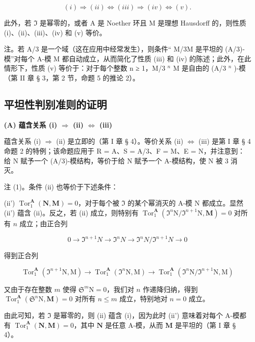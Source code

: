 \[
(i) \Rightarrow (i i) \Leftrightarrow (i i i) \Rightarrow (i v) \Leftrightarrow (v).
\]

此外，若 \(\mathfrak{I}\) 是幂零的，或者 A 是 Noether 环且 M 是理想 Hausdorff 的，则性质 (i)、(ii)、(iii)、(iv) 和 (v) 等价。

注。若 A/3 是一个域（这在应用中经常发生），则条件“ M/3M 是平坦的 (A/3)-模”对每个 A-模 M 都自动成立，从而简化了性质 (iii) 和 (iv) 的陈述；此外，在此情形下，性质 (v) 等价于：对于每个整数 n ≥ 1，M/3 \(^{n}\) M 是自由的 (A/3 \(^{n}\) )-模（第 II 章 § 3，第 2 节，命题 5 的推论 2）。

\subsection{平坦性判别准则的证明}

\textbf{(A) 蕴含关系 (i) \(\Rightarrow\) (ii) \(\Leftrightarrow\) (iii)}\par

蕴含关系 (i) \(\Rightarrow\) (ii) 是立即的（第 I 章 § 4）。等价关系 (ii) \(\Leftrightarrow\) (iii) 是第 I 章 § 4 命题 2 的特例；该命题应用于 R = A、S = A/3、F = M、E = N，并注意到：给 N 赋予一个 (A/3)-模结构，等价于给 N 赋予一个 A-模结构，使 N 被 3 消灭。

注 (1)。条件 (ii) 也等价于下述条件：

(ii') \(\operatorname{Tor}_1^{\mathbf{A}}(\mathbf{N},\mathbf{M}) = 0\)，对于每个被 \(\Im\) 的某个幂消灭的 A-模 N 都成立。显然 (ii') 蕴含 (ii)。反之，若 (ii) 成立，则特别有 \(\operatorname{Tor}_1^{\mathbf{A}}(\Im^n\mathrm{N} / \Im^{n + 1}\mathrm{N},\mathbf{M}) = 0\) 对所有 \(n\) 成立；由正合列

\[
0 \rightarrow \Im^ {n + 1} N \rightarrow \Im^ {n} N \rightarrow \Im^ {n} N / \Im^ {n + 1} N \rightarrow 0
\]

得到正合列

\[
\operatorname{Tor} _ {1} ^ {\mathbf {A}} \left(\Im^ {n + 1} \mathrm{N}, \mathrm{M}\right)\rightarrow \operatorname{Tor} _ {1} ^ {\mathbf {A}} \left(\Im^ {n} \mathrm{N}, \mathrm{M}\right)\rightarrow \operatorname{Tor} _ {1} ^ {\mathbf {A}} \left(\Im^ {n} \mathrm{N} / \Im^ {n + 1} \mathrm{N}, \mathrm{M}\right)
\]

又由于存在整数 \(m\) 使得 \(\mathfrak{S}^m\mathrm{N} = 0\)，我们对 \(n\) 作递降归纳，得到 \(\operatorname{Tor}_1^{\mathbf{A}}(\mathfrak{S}^n\mathrm{N},\mathbf{M}) = 0\) 对所有 \(n\leqslant m\) 成立，特别地对 \(n = 0\) 成立。

由此可知，若 \(\Im\) 是幂零的，则 (ii) 蕴含 (i)，因为此时 (ii') 意味着对每个 A-模都有 \(\operatorname{Tor}_1^{\mathbf{A}}(\mathbf{N},\mathbf{M}) = 0\)，其中 \(\mathbf{N}\) 是任意 A-模，从而 \(\mathbf{M}\) 是平坦的（第 I 章 § 4）。

